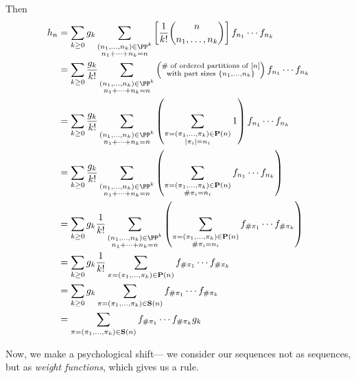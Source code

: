 \documentclass{article}
\begin{document}
Then
\begin{align*}
    h_n 
    &=
    \sum_{k\geq0}
    g_k
    \sum_{\substack{(n_1,\ldots,n_k)\in\PP^k\\n_1+\cdots+n_k=n}}
    \left[
        \frac{1}{k!}
        \binom{n}{n_1,\ldots,n_k}
    \right]
    f_{n_1}\cdots f_{n_k}
    \\
    &=
    \sum_{k\geq0}
    \frac{g_k}{k!}
    \sum_{\substack{(n_1,\ldots,n_k)\in\PP^k\\n_1+\cdots+n_k=n}}
    \left(
        \substack{
            \#\text{ of ordered partitions of }[n]\\
            \text{with part sizes }\{n_1,\ldots,n_k\}
        }
    \right)
    f_{n_1}\cdots f_{n_k}
    \\
    &=
    \sum_{k\geq0}
    \frac{g_k}{k!}
    \sum_{\substack{(n_1,\ldots,n_k)\in\PP^k\\n_1+\cdots+n_k=n}}
    \left(
        \sum_{\substack{
                \pi = (\pi_1,\ldots,\pi_k) \in \mathbf{P}(n)\\
            |\pi_i| = n_i
        }}
        1
    \right)
    f_{n_1}\cdots f_{n_k}
    \\
    &=
    \sum_{k\geq0}
    \frac{g_k}{k!}
    \sum_{\substack{(n_1,\ldots,n_k)\in\PP^k\\n_1+\cdots+n_k=n}}
    \left(
        \sum_{\substack{
                \pi = (\pi_1,\ldots,\pi_k) \in \mathbf{P}(n) \\
            \#\pi_i = n_i
        }}
        f_{n_1}\cdots f_{n_k}
    \right)
    \\
    &=
    \sum_{k\geq0}
    g_k
    \frac{1}{k!}
    \sum_{\substack{(n_1,\ldots,n_k)\in\PP^k\\n_1+\cdots+n_k=n}}
    \left(
        \sum_{\substack{
                \pi = (\pi_1,\ldots,\pi_k) \in \mathbf{P}(n) \\
            \#\pi_i = n_i
        }}
        f_{\#\pi_1}\cdots f_{\#\pi_k}
    \right)
    \\
    &=
    \sum_{k\geq0}
    g_k
    \frac{1}{k!}
    \sum_{\pi = (\pi_1,\ldots,\pi_k) \in \mathbf{P}(n)}
    f_{\#\pi_1}\cdots f_{\#\pi_k}
    \\
    &=
    \sum_{k\geq0}
    g_k
    \sum_{\pi = (\pi_1,\ldots,\pi_k) \in \mathbf{S}(n)}
    f_{\#\pi_1}\cdots f_{\#\pi_k}
    \\
    &=
    \sum_{\pi = (\pi_1,\ldots,\pi_k) \in \mathbf{S}(n)}
    f_{\#\pi_1}\cdots f_{\#\pi_k} g_k
\end{align*}


Now, we make a psychological shift--- we consider our sequences not as sequences, but as \textit{weight functions}, which gives us a rule.
\end{document}
